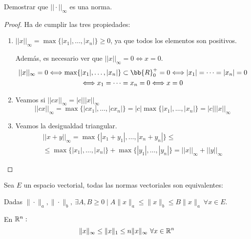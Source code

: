 \begin{ejercicio*}
    Demostrar que $||\cdot ||_\infty$ es una norma.
        \begin{proof} Ha de cumplir las tres propiedades:
    \begin{enumerate}
        \item $||x||_\infty = \max\{|x_1|,\dots, |x_n|\} \geq 0$, ya que todos los elementos son positivos.
        
        Además, es necesario ver que $||x||_\infty = 0 \Longleftrightarrow x = 0$.
        \begin{multline*}
            ||x||_\infty = 0 \Longleftrightarrow \max\{|x_1|,\dots, |x_n|\} \subset \bb{R}^+_0 = 0 \Longleftrightarrow |x_1| = \dots = |x_n| = 0 \\
            \Longleftrightarrow x_1 = \dots = x_n = 0 \Longleftrightarrow x = 0
        \end{multline*}

        \item Veamos si $||cx||_\infty = |c| ||x||_\infty$
        \begin{equation*}
            ||cx||_\infty = \max\{|cx_1|,\dots, |cx_n|\} = |c|\max\{|x_1|,\dots, |x_n|\} = |c|||x||_\infty
        \end{equation*}

        \item Veamos la desigualdad triangular.
        \begin{multline*}
            ||x+y||_\infty = \max\{|x_1+y_1|,\dots, |x_n + y_n|\} \leq \\
            \leq \max\{|x_1|,\dots, |x_n|\} + \max\{|y_1|,\dots, |y_n|\} = ||x||_\infty + ||y||_\infty
        \end{multline*}
    \end{enumerate}
    \end{proof}
\end{ejercicio*}

\begin{teo}
    Sea $E$ un espacio vectorial, todas las normas vectoriales son equivalentes:

    Dadas $\|\cdot\|_a, \|\cdot\|_b, \ \exists A,B \geq 0 \mid A \|x\|_a \leq \|x\|_b \leq B\|x\|_a \ \forall x \in E$.
\end{teo}

\begin{ejemplo}
    En $\mathbb R^n:$
$$\|x\|_\infty \leq \|x\|_1 \leq n\|x\|_\infty \ \forall x \in \R^n$$
\end{ejemplo}

